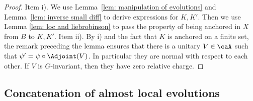 \begin{proof}
	Item i).  We use Lemma~\ref{lem: manipulation of evolutions} and Lemma~\ref{lem: inverse small diff} to derive expressions for $K,K'$. Then we use Lemma \ref{lem: loc and liebrobinson} to pass the property of being anchored in $X$ from $B$ to $K,K'$. 
	Item ii). By i) and the fact that $K$ is anchored on a finite set, the remark preceding the lemma ensures that there is a unitary $V\in\caA$ such that $\psi'=\psi\circ\Adjoint(V)$. In particular they are normal with respect to each other. If $V$ is $G$-invariant, then they have zero relative charge.    
\end{proof}



\subsection{Concatenation of almost local evolutions}

